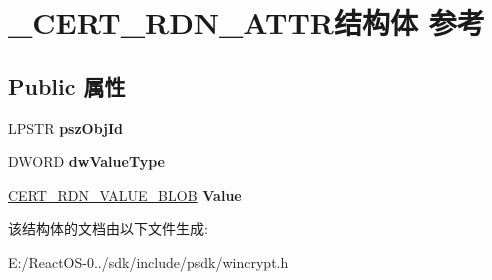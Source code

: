 \hypertarget{struct___c_e_r_t___r_d_n___a_t_t_r}{}\section{\+\_\+\+C\+E\+R\+T\+\_\+\+R\+D\+N\+\_\+\+A\+T\+T\+R结构体 参考}
\label{struct___c_e_r_t___r_d_n___a_t_t_r}
\subsection*{Public 属性}
\begin{DoxyCompactItemize}
\item 
\mbox{\label{struct___c_e_r_t___r_d_n___a_t_t_r_a27dd8e3d6eb7fb723b2f9a77828b7bca}} 
L\+P\+S\+TR {\bfseries psz\+Obj\+Id}
\item 
\mbox{\label{struct___c_e_r_t___r_d_n___a_t_t_r_aa046eea569f6af188d258b827030a333}} 
D\+W\+O\+RD {\bfseries dw\+Value\+Type}
\item 
\mbox{\label{struct___c_e_r_t___r_d_n___a_t_t_r_ac1e3863fc173fc062fe5de7cd064807c}} 
\hyperlink{struct___c_r_y_p_t_o_a_p_i___b_l_o_b}{C\+E\+R\+T\+\_\+\+R\+D\+N\+\_\+\+V\+A\+L\+U\+E\+\_\+\+B\+L\+OB} {\bfseries Value}
\end{DoxyCompactItemize}


该结构体的文档由以下文件生成\+:\begin{DoxyCompactItemize}
\item 
E\+:/\+React\+O\+S-\/0../sdk/include/psdk/wincrypt.\+h\end{DoxyCompactItemize}

